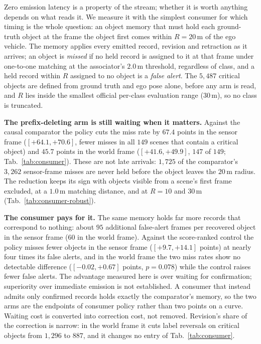 Zero emission latency is a property of the stream; whether it is worth
anything depends on what reads it. We measure it with the simplest consumer
for which timing is the whole question: an object memory that must hold each
ground-truth object at the frame the object first comes within $R{=}20$\,m of
the ego vehicle. The memory applies every emitted record, revision and
retraction as it arrives; an object is \emph{missed} if no held record is
assigned to it at that frame under one-to-one matching at the associator's
$2.0$\,m threshold, regardless of class, and a held record within $R$ assigned to no object is a \emph{false
alert}. The $5{,}487$ critical objects are defined from ground truth and ego
pose alone, before any arm is read, and $R$ lies inside the smallest official
per-class evaluation range ($30$\,m), so no class is truncated.

\noindent\textbf{The prefix-deleting arm is still waiting when it matters.}
Against the causal comparator the policy cuts the miss rate by $67.4$ points in
the sensor frame ($[{+}64.1,{+}70.6]$, fewer misses in all $149$ scenes that
contain a critical object) and $45.7$ points in the world frame
($[{+}41.6,{+}49.9]$, $147$ of $149$; Tab.~\ref{tab:consumer}). These are not
late arrivals: $1{,}725$ of the comparator's $3{,}262$ sensor-frame misses are
never held before the object leaves the $20$\,m radius. The reduction keeps its
sign with objects visible from a scene's first frame excluded, at a $1.0$\,m
matching distance, and at $R{=}10$ and $30$\,m (Tab.~\ref{tab:consumer-robust}).

\noindent\textbf{The consumer pays for it.} The same memory holds far more
records that correspond to nothing: about $95$ additional false-alert frames
per recovered object in the sensor frame ($60$ in the world frame). Against the
score-ranked control the policy misses fewer
objects in the sensor frame ($[{+}9.7,{+}14.1]$ points) at nearly four times
its false alerts, and in the world frame the two miss rates show no detectable
difference ($[{-}0.02,{+}0.67]$ points, $p{=}0.078$) while the control raises
fewer false alerts. The advantage measured here is over waiting for
confirmation; superiority over immediate emission is not established. A consumer that instead admits only
confirmed records holds exactly the comparator's memory, so the two arms are
the endpoints of consumer policy rather than two points on a curve. Waiting
cost is converted into correction cost, not removed. Revision's share of the
correction is narrow: in the world frame it cuts label reversals on critical
objects from $1{,}296$ to $887$, and it changes no entry of
Tab.~\ref{tab:consumer}.



